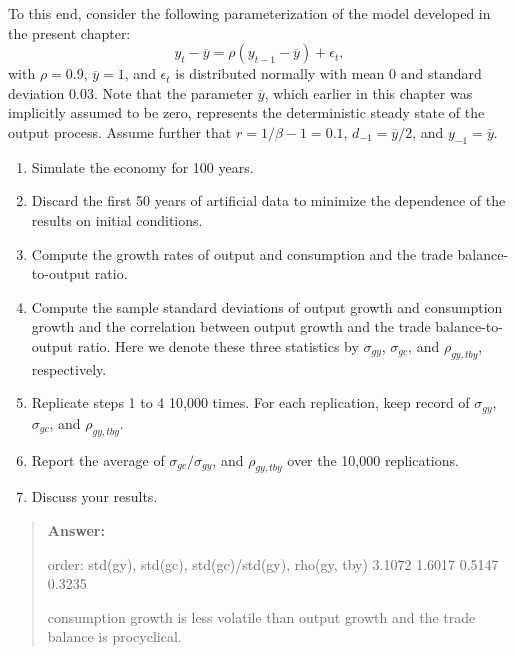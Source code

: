 \begin{exercise}
To this end, consider the following parameterization of the model developed in the present chapter: 
\[y_t - \overline{y} = \rho (y_{t-1} - \overline{y}) + \epsilon_t,
\]
with $\rho=0.9$, $\overline{y}=1$, and $\epsilon_t$ is distributed normally with mean 0 and standard deviation 0.03. Note that the parameter $\overline{y}$, which earlier in this chapter was implicitly assumed to be zero, represents the deterministic steady state of the output process. Assume further that   
$r=1/\beta-1=0.1$, $d_{-1}= \overline{y}/2$, and $y_{-1}=\overline{y}$.  
\begin{enumerate}
\item Simulate the economy for 100 years. 
\item Discard the first 50 years of artificial data to minimize the dependence of the results on initial conditions. 
\item Compute the growth rates of output and consumption and the trade balance-to-output ratio. 
\item Compute the sample standard deviations of output growth and consumption growth and the correlation between output growth and the trade balance-to-output ratio. Here we denote these three statistics by $\sigma_{gy}$, $\sigma_{gc}$, and $\rho_{gy,tby}$, respectively. 
\item Replicate steps 1 to 4 10,000 times. For each replication, keep record of $\sigma_{gy}$, $\sigma_{gc}$, and $\rho_{gy,tby}$. 
\item Report the average of  $\sigma_{gc}/\sigma_{gy}$, and $\rho_{gy,tby}$ over the 10,000 replications. 
\item Discuss your results.
\end{enumerate}
\begin{quote}
{\bf Answer: } 


order: std(gy), std(gc), std(gc)/std(gy), rho(gy, tby)
    3.1072
    1.6017
    0.5147
    0.3235

consumption growth is less volatile than output growth and the  trade balance is procyclical. 



\end{quote}

\end{exercise}

